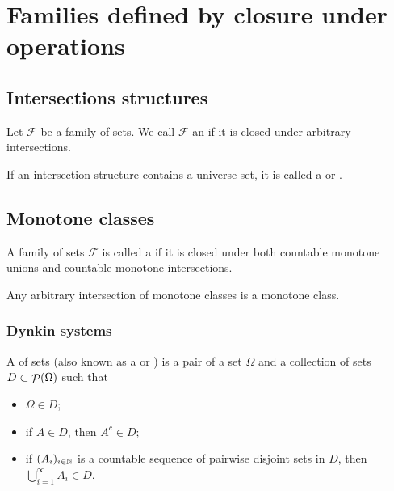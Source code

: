 \section{Families defined by closure under operations}
\subsection{Intersections structures}
\begin{definition}
Let $\mathcal{F}$ be a family of sets. We call $\mathcal{F}$ an  if it is closed under arbitrary intersections.

If an intersection structure contains a universe set, it is called a  or .
\end{definition}

\subsection{Monotone classes}
\begin{definition}
A family of sets $\mathcal{F}$ is called a  if it is closed under both countable monotone unions and countable monotone intersections.
\end{definition}
\begin{lemma}
Any arbitrary intersection of monotone classes is a monotone class.
\end{lemma}

\subsubsection{Dynkin systems}
\begin{definition}
A  of sets (also known as a  or ) is a pair of a set $\Omega$ and a collection of sets $D\subset\mathop{\mathcal{P}}(\Omega)$ such that
\begin{itemize}
\item $\Omega\in D$;
\item if $A\in D$, then $A^c\in D$;
\item if $(A_i)_{i\in\mathbb{N}}$ is a countable sequence of pairwise disjoint sets in $D$, then $\bigcup_{i=1}^\infty A_i\in D$.
\end{itemize}
\end{definition}

